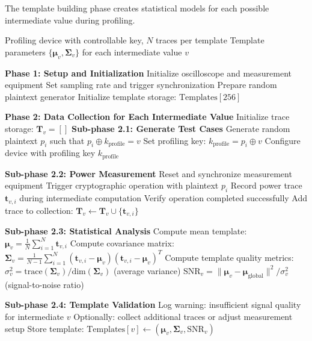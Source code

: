 \documentclass[11pt,a4paper]{article}
\theoremstyle{definition}
\begin{document}
The template building phase creates statistical models for each possible intermediate value during profiling.

\begin{algorithm}
\caption{Detailed Template Building for Power Analysis}
\begin{algorithmic}[1]
\REQUIRE Profiling device with controllable key, $N$ traces per template
\ENSURE Template parameters $\{\boldsymbol{\mu}_v, \boldsymbol{\Sigma}_v\}$ for each intermediate value $v$

\STATE \textbf{Phase 1: Setup and Initialization}
\STATE Initialize oscilloscope and measurement equipment
\STATE Set sampling rate and trigger synchronization
\STATE Prepare random plaintext generator
\STATE Initialize template storage: $\text{Templates}[256]$

\STATE \textbf{Phase 2: Data Collection for Each Intermediate Value}
    \STATE Initialize trace storage: $\mathbf{T}_v = []$
    \STATE \textbf{Sub-phase 2.1: Generate Test Cases}
        \STATE Generate random plaintext $p_i$ such that $p_i \oplus k_{\text{profile}} = v$
        \STATE Set profiling key: $k_{\text{profile}} = p_i \oplus v$
        \STATE Configure device with profiling key $k_{\text{profile}}$
        
        \STATE \textbf{Sub-phase 2.2: Power Measurement}
        \STATE Reset and synchronize measurement equipment
        \STATE Trigger cryptographic operation with plaintext $p_i$
        \STATE Record power trace $\mathbf{t}_{v,i}$ during intermediate computation
        \STATE Verify operation completed successfully
        \STATE Add trace to collection: $\mathbf{T}_v \leftarrow \mathbf{T}_v \cup \{\mathbf{t}_{v,i}\}$
    \ENDFOR
    
    \STATE \textbf{Sub-phase 2.3: Statistical Analysis}
    \STATE Compute mean template: $\boldsymbol{\mu}_v = \frac{1}{N} \sum_{i=1}^N \mathbf{t}_{v,i}$
    \STATE Compute covariance matrix: 
    \STATE $\boldsymbol{\Sigma}_v = \frac{1}{N-1} \sum_{i=1}^N (\mathbf{t}_{v,i} - \boldsymbol{\mu}_v)(\mathbf{t}_{v,i} - \boldsymbol{\mu}_v)^T$
    \STATE Compute template quality metrics:
    \STATE $\sigma_v^2 = \text{trace}(\boldsymbol{\Sigma}_v) / \text{dim}(\boldsymbol{\Sigma}_v)$ (average variance)
    \STATE $\text{SNR}_v = \|\boldsymbol{\mu}_v - \boldsymbol{\mu}_{\text{global}}\|^2 / \sigma_v^2$ (signal-to-noise ratio)
    
    \STATE \textbf{Sub-phase 2.4: Template Validation}
        \STATE Log warning: insufficient signal quality for intermediate $v$
        \STATE Optionally: collect additional traces or adjust measurement setup
    \ENDIF
    \STATE Store template: $\text{Templates}[v] \leftarrow (\boldsymbol{\mu}_v, \boldsymbol{\Sigma}_v, \text{SNR}_v)$
    

\end{algorithmic}
\end{algorithm}
\end{document}
